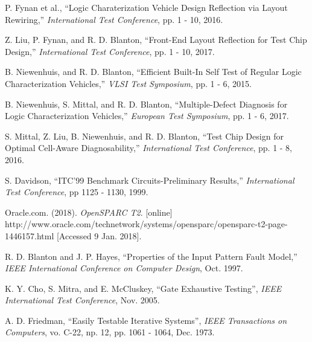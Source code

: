 \documentclass[journal]{IEEEtran}
\begin{document}
\begin{thebibliography}{1}
	P. Fynan et al., ``Logic Charaterization Vehicle Design Reflection via Layout Rewiring,'' \emph{International Test Conference}, pp. 1 - 10, 2016.
	
	Z. Liu, P. Fynan, and R. D. Blanton, ``Front-End Layout Reflection for Test Chip Design,'' \emph{International Test Conference}, pp. 1 - 10, 2017.
	
	B. Niewenhuis, and R. D. Blanton, ``Efficient Built-In Self Test of Regular Logic Characterization Vehicles,'' \emph{VLSI Test Symposium}, pp. 1 - 6, 2015.
	
	B. Niewenhuis, S. Mittal, and R. D. Blanton, ``Multiple-Defect Diagnosis for Logic Characterization Vehicles,'' \emph{European Test Symposium}, pp. 1 - 6, 2017.

	S. Mittal, Z. Liu, B. Niewenhuis, and R. D. Blanton, ``Test Chip Design for Optimal Cell-Aware Diagnosability,'' \emph{International Test Conference}, pp. 1 - 8, 2016.
	
	S. Davidson, ``ITC'99 Benchmark Circuits-Preliminary Results,'' \emph{International Test Conference}, pp 1125 - 1130, 1999.
	
	Oracle.com. (2018). \emph{OpenSPARC T2}. [online] http://www.oracle.com/technetwork/systems/opensparc/opensparc-t2-page-1446157.html [Accessed 9 Jan. 2018].
	
	R. D. Blanton and J. P. Hayes, ``Properties of the Input Pattern Fault Model,'' \emph{IEEE International Conference on Computer Design}, Oct. 1997.
	
	K. Y. Cho, S. Mitra, and E. McCluskey, ``Gate Exhaustive Testing'', \emph{IEEE International Test Conference}, Nov. 2005.
	
	A. D. Friedman, ``Easily Testable Iterative Systems'', \emph{IEEE Transactions on Computers}, vo. C-22, np. 12, pp. 1061 - 1064, Dec. 1973.

\end{thebibliography}

% 
\end{document}

